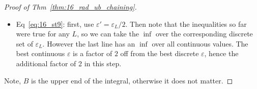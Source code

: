 \documentclass[twoside]{article}
\begin{document}
\begin{proof}[Proof of Thm~\ref{thm:16_rad_ub_chaining}]
\begin{itemize}
        \item Eq~\ref{eq:16_st9}: first, use $\varepsilon' = \varepsilon_L/2$. Then note that the inequalities so far were true for any $L$, so we can take the $\inf$ over the corresponding discrete set of $\varepsilon_L$. However the last line has an $\inf$ over all continuous values. The best continuous $\varepsilon$ is a factor of $2$ off from the best discrete $\varepsilon$, hence the additional factor of 2 in this step. 
    \end{itemize} 
    Note, $B$ is the upper end of the integral, otherwise it does not matter.
\end{proof}

\vspace*{\fill}


















\end{document}
